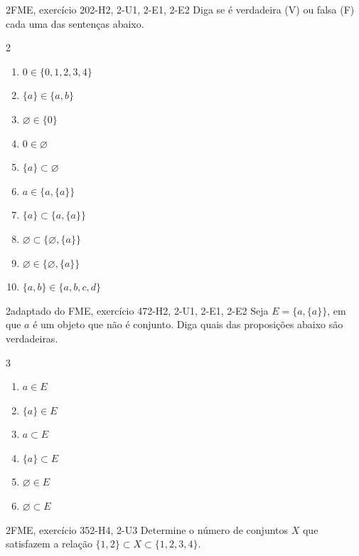 \begin{questao}{2}{FME, exercício 20}{2-H2, 2-U1, 2-E1, 2-E2}\label{u2:fme20}
Diga se é verdadeira (V) ou falsa (F) cada uma das sentenças abaixo.
\begin{multicols}{2}
\begin{enumerate}[label=\alph*)]
  \item $0\in\{0,1,2,3,4\}$
  \item $\{a\}\in\{a,b\}$
  \item $\varnothing\in\{0\}$
  \item $0\in\varnothing$
  \item $\{a\}\subset\varnothing$
  \item $a\in\{a,\{a\}\}$
  \item $\{a\}\subset\{a,\{a\}\}$
  \item $\varnothing\subset\{\varnothing,\{a\}\}$
  \item $\varnothing\in\{\varnothing,\{a\}\}$
  \item $\{a,b\}\in\{a,b,c,d\}$
\end{enumerate}
\end{multicols}
\end{questao}

\begin{questao}{2}{adaptado do FME, exercício 47}{2-H2, 2-U1, 2-E1, 2-E2}\label{u2:fme47}
Seja $E=\{a,\{a\}\}$, em que $a$ é um objeto que não é conjunto. Diga quais das proposições abaixo são verdadeiras.
\begin{multicols}{3}
\begin{enumerate}[label=\alph*)]
  \item $a\in E$
  \item $\{a\}\in E$
  \item $a\subset E$
  \item $\{a\}\subset E$
  \item $\varnothing\in E$
  \item $\varnothing\subset E$
\end{enumerate}
\end{multicols}
\end{questao}





\begin{questao}{2}{FME, exercício 35}{2-H4, 2-U3}\label{u2:fme35}
Determine o número de conjuntos $X$ que satisfazem a relação $\{1,2\}\subset X\subset\{1,2,3,4\}$.
\end{questao}

